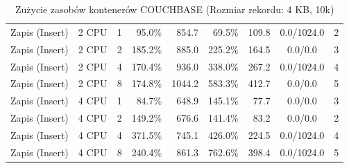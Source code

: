 \begin{table}[ht]
{\begin{tabular}{llcrrrrcc}
Zapis (Insert) & 2 CPU & 1 & 95.0\% & 854.7 & 69.5\% & 109.8 & 0.0/1024.0 & 2 \\
Zapis (Insert) & 2 CPU & 2 & 185.2\% & 885.0 & 225.2\% & 164.5 & 0.0/0.0 & 3 \\
Zapis (Insert) & 2 CPU & 4 & 170.4\% & 936.0 & 338.0\% & 267.2 & 0.0/1024.0 & 4 \\
Zapis (Insert) & 2 CPU & 8 & 174.8\% & 1044.2 & 583.3\% & 412.7 & 0.0/0.0 & 5 \\
Zapis (Insert) & 4 CPU & 1 & 84.7\% & 648.9 & 145.1\% & 77.7 & 0.0/0.0 & 3 \\
Zapis (Insert) & 4 CPU & 2 & 149.2\% & 676.6 & 141.4\% & 83.2 & 0.0/0.0 & 2 \\
Zapis (Insert) & 4 CPU & 4 & 371.5\% & 745.1 & 426.0\% & 224.5 & 0.0/1024.0 & 4 \\
Zapis (Insert) & 4 CPU & 8 & 240.4\% & 861.3 & 762.6\% & 398.4 & 0.0/1024.0 & 5 \\
\bottomrule
\end{tabular}%
}
\caption{Zużycie zasobów kontenerów COUCHBASE (Rozmiar rekordu: 4 KB, 10k)}
\label{tab:resources_couchbase_medium_10000}
\end{table}
